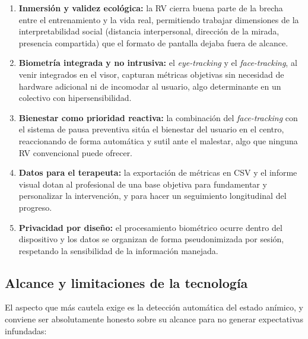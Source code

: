 \documentclass[12pt,twoside,titlepage]{report}
\begin{document}
\begin{enumerate}[label=\textbf{\arabic*.}, leftmargin=1.5cm, itemsep=0.5em]
  \item \textbf{Inmersión y validez ecológica:} la RV cierra buena parte de la brecha entre el entrenamiento y la vida real, permitiendo trabajar dimensiones de la interpretabilidad social (distancia interpersonal, dirección de la mirada, presencia compartida) que el formato de pantalla dejaba fuera de alcance.
  \item \textbf{Biometría integrada y no intrusiva:} el \textit{eye-tracking} y el \textit{face-tracking}, al venir integrados en el visor, capturan métricas objetivas sin necesidad de hardware adicional ni de incomodar al usuario, algo determinante en un colectivo con hipersensibilidad.
  \item \textbf{Bienestar como prioridad reactiva:} la combinación del \textit{face-tracking} con el sistema de pausa preventiva sitúa el bienestar del usuario en el centro, reaccionando de forma automática y sutil ante el malestar, algo que ninguna RV convencional puede ofrecer.
  \item \textbf{Datos para el terapeuta:} la exportación de métricas en CSV y el informe visual dotan al profesional de una base objetiva para fundamentar y personalizar la intervención, y para hacer un seguimiento longitudinal del progreso.
  \item \textbf{Privacidad por diseño:} el procesamiento biométrico ocurre dentro del dispositivo y los datos se organizan de forma pseudonimizada por sesión, respetando la sensibilidad de la información manejada.
\end{enumerate}

\subsection{Alcance y limitaciones de la tecnología}

El aspecto que más cautela exige es la detección automática del estado anímico, y conviene ser absolutamente honesto sobre su alcance para no generar expectativas infundadas:
\end{document}
